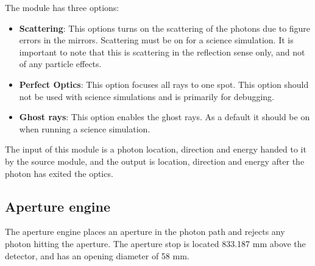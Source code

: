 The module has three options:
\begin{itemize}
\item \textbf{Scattering}: This options turns on the scattering of the photons due to figure errors in the mirrors. Scattering must be on for a science simulation. It is important to note that this is scattering in the reflection sense only, and not of any particle effects.
\item \textbf{Perfect Optics}: This option focuses all rays to one spot. This option should not be used with science simulations and is primarily for debugging.
\item \textbf{Ghost rays}: This option enables the ghost rays. As a default it should be on when running a science simulation. 
\end{itemize}

The input of this module is a photon location, direction and energy handed to it by the source module, and the output is location, direction and energy after the photon has exited the optics.


\subsection{Aperture engine}
The aperture engine places an aperture in the photon path and rejects any photon hitting the aperture. The aperture stop is located 833.187 mm above the detector, and has an opening diameter of 58 mm.


